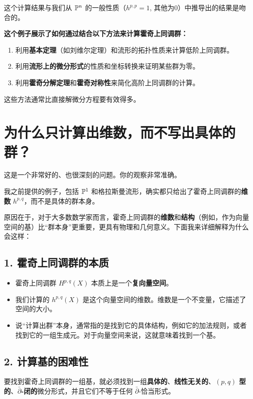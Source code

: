 \documentclass{amsart}
\let\originalmathbb\mathbb
\renewcommand{\mathbb}[1]{%
    \ifstrequal{#1}{1}{\mathbbm{#1}}{\originalmathbb{#1}}%
}
\theoremstyle{plain}
\theoremstyle{definition}
\theoremstyle{remark}
\begin{document}
这个计算结果与我们从 $\mathbb{P}^n$ 的一般性质（$h^{p,p}=1$, 其他为0）中推导出的结果是吻合的。

\textbf{这个例子展示了如何通过结合以下方法来计算霍奇上同调群：}

\begin{enumerate}
	\item 利用\textbf{基本定理}（如刘维尔定理）和流形的拓扑性质来计算低阶上同调群。
	\item 利用\textbf{流形上的微分形式}的性质和坐标转换来证明某些群为零。
	\item 利用\textbf{霍奇分解定理}和\textbf{霍奇对称性}来简化高阶上同调群的计算。
\end{enumerate}

这些方法通常比直接解微分方程要有效得多。

\section{为什么只计算出维数，而不写出具体的群？}

这是一个非常好的、也很深刻的问题。你的观察非常准确。

我之前提供的例子，包括 $\mathbb{P}^1$ 和格拉斯曼流形，确实都只给出了霍奇上同调群的\textbf{维数} $h^{p,q}$，而不是具体的群本身。

原因在于，对于大多数数学家而言，霍奇上同调群的\textbf{维数}和\textbf{结构}（例如，作为向量空间的基）比“群本身”更重要，更具有物理和几何意义。下面我来详细解释为什么会这样：

\subsection{1. 霍奇上同调群的本质}

\begin{itemize}
	\item 霍奇上同调群 $H^{p,q}(X)$ 本质上是一个\textbf{复向量空间}。
	\item 我们计算的 $h^{p,q}(X)$ 是这个向量空间的维数。维数是一个不变量，它描述了空间的大小。
	\item 说“计算出群”本身，通常指的是找到它的具体结构，例如它的加法规则，或者找到它的一组生成元。对于向量空间来说，这就意味着找到一个基。
\end{itemize}

\subsection{2. 计算基的困难性}

要找到霍奇上同调群的一组基，就必须找到一组\textbf{具体的}、\textbf{线性无关的}、\textbf{$(p,q)$ 型的}、\textbf{$\bar{\partial}$-闭的}微分形式，并且它们不等于任何 $\bar{\partial}$-恰当形式。
\end{document}
